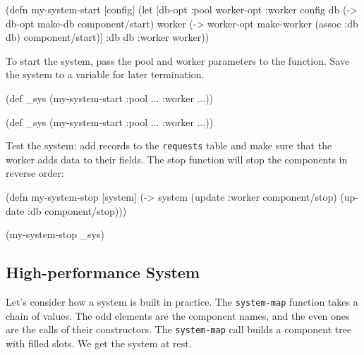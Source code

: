 \begin{english}
  \begin{clojure/lines}
(defn my-system-start
  [config]
  (let [{db-opt :pool
         worker-opt :worker} config
        db (-> db-opt
               make-db
               component/start)
        worker (-> worker-opt
                   make-worker
                   (assoc :db db)
                   component/start)]
    {:db db :worker worker}))
  \end{clojure/lines}
\end{english}

To start the system, pass the pool and worker parameters to the function. Save the system to a variable for later termination.

\ifnarrow

\begin{english}
  \begin{clojure}
(def _sys
  (my-system-start
    {:pool {...} :worker {...}}))
  \end{clojure}
\end{english}

\else

\begin{english}
  \begin{clojure}
(def _sys (my-system-start {:pool {...} :worker {...}}))
  \end{clojure}
\end{english}

\fi

Test the system: add records to the \verb|requests| table and make sure that the worker adds data to their fields. The stop function will stop the components in reverse order:

\begin{english}
  \begin{clojure}
(defn my-system-stop
  [system]
  (-> system
      (update :worker component/stop)
      (update :db component/stop)))

(my-system-stop _sys)
  \end{clojure}
\end{english}

\subsection{High-performance System}


Let's consider how a system is built in practice. The \verb|system-map| function takes a chain of values. The odd elements are the component names, and the even ones are the calls of their constructors. The \verb|system-map| call builds a component tree with filled slots. We get the system at rest.

